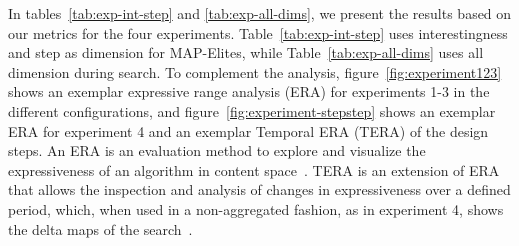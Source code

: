 
%



In tables~\ref{tab:exp-int-step} and \ref{tab:exp-all-dims}, we present the results based on our metrics for the four experiments. Table~\ref{tab:exp-int-step} uses interestingness and step as dimension for MAP-Elites, while Table~\ref{tab:exp-all-dims} uses all dimension during search. To complement the analysis, figure~\ref{fig:experiment123} shows an exemplar expressive range analysis (ERA) for experiments 1-3 in the different configurations, and figure~\ref{fig:experiment-stepstep} shows an exemplar ERA for experiment 4 and an exemplar Temporal ERA (TERA) of the design steps. An ERA is an evaluation method to explore and visualize the expressiveness of an algorithm in content space~. TERA is an extension of ERA that allows the inspection and analysis of changes in expressiveness over a defined period, which, when used in a non-aggregated fashion, as in experiment 4, shows the delta maps of the search~.

